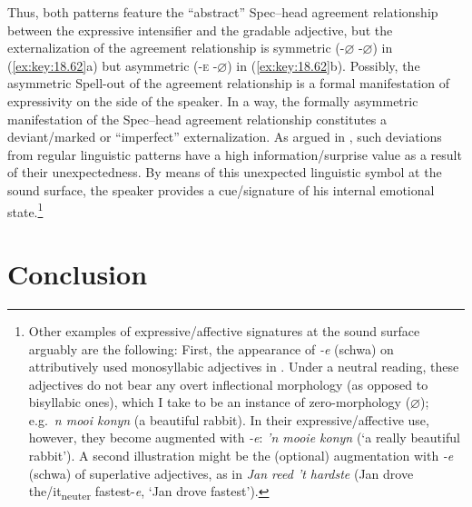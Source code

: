 \documentclass[output=paper]{langsci/langscibook}
\begin{document}
Thus, both patterns feature the \enquote{abstract} Spec--head agreement
relationship between the expressive intensifier and the gradable adjective, but
the externalization of the agreement relationship is symmetric
(-${\varnothing}$ -${\varnothing}$) in (\ref{ex:key:18.62}a) but asymmetric
(\textsc{-e} -${\varnothing}$) in (\ref{ex:key:18.62}b). Possibly, the asymmetric
Spell-out of the agreement relationship is a formal manifestation of
expressivity on the side of the speaker. In a way, the formally asymmetric
manifestation of the Spec--head agreement relationship constitutes a
deviant/marked or \enquote{imperfect} externalization. As argued in
\textcite{Corver2013,Corver2016}, such deviations from regular linguistic
patterns have a high information/surprise value as a result of their
unexpectedness. By means of this unexpected linguistic symbol at the sound
surface, the speaker provides a cue/signature of his internal emotional
state.\footnote{Other examples of expressive/affective signatures at the sound
    surface arguably are the following:  First, the appearance of \emph{-e}
    (schwa) on attributively used monosyllabic adjectives in .
    Under a neutral reading, these adjectives do not bear any overt
    inflectional morphology (as opposed to bisyllabic ones), which I take to be
    an instance of zero-morphology ($\varnothing$); e.g.\ \emph{n mooi konyn}
    (a beautiful rabbit). In their expressive/affective use, however, they
    become augmented with \emph{-e}: \emph{'n mooie konyn} (\enquote*{a really
    beautiful rabbit}). A second illustration might be the (optional)
    augmentation with \emph{-e} (schwa) of  superlative adjectives,
as in \emph{Jan reed 't hardste} (Jan drove the/it\textsubscript{neuter}
fastest-\emph{e}, \enquote*{Jan drove fastest}).}

\section{Conclusion}\label{sec:key:18.9}
\end{document}
